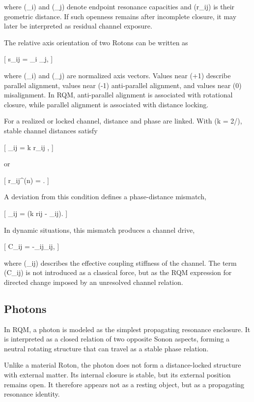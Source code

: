 \documentclass[11pt,a4paper]{article}
\begin{document}
where (\rho_i) and (\rho_j) denote endpoint resonance capacities and (r_{ij}) is their geometric distance. If such openness remains after incomplete closure, it may later be interpreted as residual channel exposure.

The relative axis orientation of two Rotons can be written as

[
s_{ij} = _i \cdot {}_j,
]

where (_i) and (_j) are normalized axis vectors. Values near (+1) describe parallel alignment, values near (-1) anti-parallel alignment, and values near (0) misalignment. In RQM, anti-parallel alignment is associated with rotational closure, while parallel alignment is associated with distance locking.

For a realized or locked channel, distance and phase are linked. With (k = 2\pi/\lambda), stable channel distances satisfy

[
\Delta \phi_{ij} = k r_{ij} \pi,
]

or

[
r_{ij}^{(n)} = .
]

A deviation from this condition defines a phase-distance mismatch,

[
\epsilon_{ij} = (k r{ij} - \Delta \phi_{ij}).
]

In dynamic situations, this mismatch produces a channel drive,

[
C_{ij} = -\kappa_{ij}\epsilon_{ij},
]

where (\kappa_{ij}) describes the effective coupling stiffness of the channel. The term (C_{ij}) is not introduced as a classical force, but as the RQM expression for directed change imposed by an unresolved channel relation.



\subsection{Photons}

In RQM, a photon is modeled as the simplest propagating resonance enclosure. It is interpreted as a closed relation of two opposite Sonon aspects, forming a neutral rotating structure that can travel as a stable phase relation.

Unlike a material Roton, the photon does not form a distance-locked structure with external matter. Its internal closure is stable, but its external position remains open. It therefore appears not as a resting object, but as a propagating resonance identity.
\end{document}
